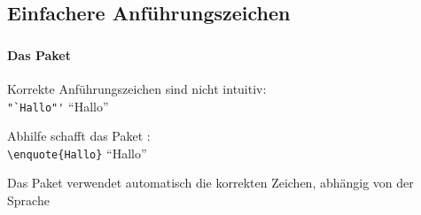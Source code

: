 \subsection{Einfachere Anführungszeichen}

\begin{frame}[fragile]
    \frametitle{\subsecname}
    \framesubtitle{Das Paket }
    
    Korrekte Anführungszeichen sind nicht intuitiv:\\
    \verb+"`Hallo"'+ \textrightarrow{} "`Hallo"'
    
    \bigskip\pause
    Abhilfe schafft das Paket :\\
    \verb+\enquote{Hallo}+ \textrightarrow{} \enquote{Hallo}
    
    \bigskip
    Das Paket verwendet automatisch die korrekten Zeichen, abhängig von der Sprache
\end{frame}